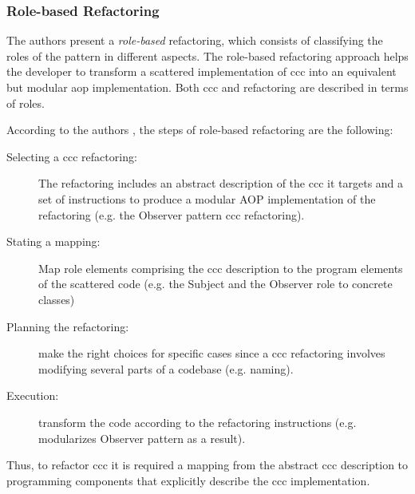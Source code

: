 \subsubsection{Role-based Refactoring}
The authors present a \textit{role-based} refactoring, which consists of classifying the roles of the pattern in different aspects.
The role-based refactoring approach helps the developer to transform a scattered implementation of \ac{ccc} into an equivalent but modular \ac{aop} implementation. 
Both \ac{ccc} and refactoring are described in terms of roles. 

According to the authors \cite{hannemann2005role}, the steps of role-based refactoring are the following:
\begin{description}

	\item [Selecting a \ac{ccc} refactoring:] The refactoring includes an abstract description of the \ac{ccc} it targets and a set of instructions to produce a modular AOP implementation of the refactoring (e.g. the Observer pattern \ac{ccc} refactoring).

	\item [Stating a mapping:] Map role elements comprising the \ac{ccc} description to the program elements of the scattered code (e.g. the Subject and the Observer role to concrete classes)

	\item [Planning the refactoring:] make the right choices for specific cases since a \ac{ccc} refactoring involves modifying several parts of a codebase (e.g. naming).

	\item [Execution:] transform the code according to the refactoring instructions (e.g. modularizes Observer pattern as a result).
\end{description}

Thus, to refactor \ac{ccc} it is required a mapping from the abstract \ac{ccc} description to programming components that explicitly describe the \ac{ccc} implementation.


